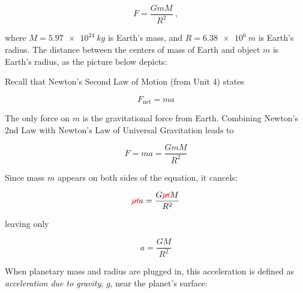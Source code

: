 \documentclass[main.tex]{subfiles}
\begin{document}
\begin{equation*}
    F = \frac{G m M}{R^2}\ ,
\end{equation*}

where $M = \SI{5.97e24}{kg}$ is Earth's mass, and $R = \SI{6.38e6}{m}$ is Earth's radius. The distance between the centers of mass of Earth and object $m$ is Earth's radius, as the picture below depicts:


\begin{center}
    \centering
\end{center}

Recall that Newton's Second Law of Motion (from Unit 4) states

\begin{equation*}
    F_{\text{net}} = m a
\end{equation*}

The only force on $m$ is the gravitational force from Earth. Combining Newton's 2nd Law with Newton's Law of Universal Gravitation leads to

\begin{equation*}
    F = ma = \frac{G m M}{R^2}
\end{equation*}

Since mass $m$ appears on both sides of the equation, it cancels:

\begin{equation*}
    \textcolor{red}{\cancel{m}}a = \frac{G \textcolor{red}{\cancel{m}} M}{R^2}
\end{equation*}

leaving only

\begin{equation*}
    a = \frac{G M}{R^2}
\end{equation*}

When planetary mass and radius are plugged in, this acceleration is defined as \textit{acceleration due to gravity}, $g$, near the planet's surface:
\end{document}

